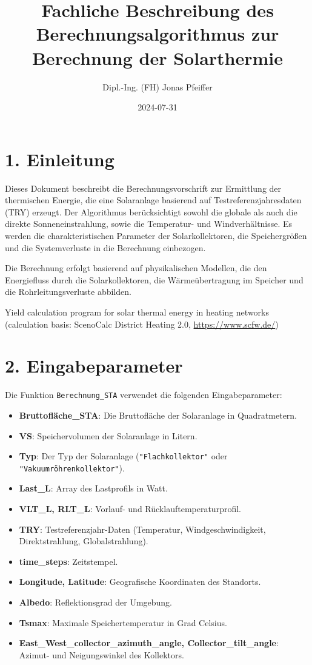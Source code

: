 \documentclass{article}
\title{Fachliche Beschreibung des Berechnungsalgorithmus zur Berechnung der Solarthermie}
\author{Dipl.-Ing. (FH) Jonas Pfeiffer}
\date{2024-07-31}
\begin{document}
\maketitle

\section*{1. Einleitung}

Dieses Dokument beschreibt die Berechnungsvorschrift zur Ermittlung der thermischen Energie, die eine Solaranlage basierend auf Testreferenzjahresdaten (TRY) erzeugt. Der Algorithmus berücksichtigt sowohl die globale als auch die direkte Sonneneinstrahlung, sowie die Temperatur- und Windverhältnisse. Es werden die charakteristischen Parameter der Solarkollektoren, die Speichergrößen und die Systemverluste in die Berechnung einbezogen. 

Die Berechnung erfolgt basierend auf physikalischen Modellen, die den Energiefluss durch die Solarkollektoren, die Wärmeübertragung im Speicher und die Rohrleitungsverluste abbilden.

Yield calculation program for solar thermal energy in heating networks (calculation basis: ScenoCalc District Heating 2.0, \url{https://www.scfw.de/})

\section*{2. Eingabeparameter}

Die Funktion \texttt{Berechnung\_STA} verwendet die folgenden Eingabeparameter:

\begin{itemize}
    \item \textbf{Bruttofläche\_STA}: Die Bruttofläche der Solaranlage in Quadratmetern.
    \item \textbf{VS}: Speichervolumen der Solaranlage in Litern.
    \item \textbf{Typ}: Der Typ der Solaranlage (\texttt{"Flachkollektor"} oder \texttt{"Vakuumröhrenkollektor"}).
    \item \textbf{Last\_L}: Array des Lastprofils in Watt.
    \item \textbf{VLT\_L, RLT\_L}: Vorlauf- und Rücklauftemperaturprofil.
    \item \textbf{TRY}: Testreferenzjahr-Daten (Temperatur, Windgeschwindigkeit, Direktstrahlung, Globalstrahlung).
    \item \textbf{time\_steps}: Zeitstempel.
    \item \textbf{Longitude, Latitude}: Geografische Koordinaten des Standorts.
    \item \textbf{Albedo}: Reflektionsgrad der Umgebung.
    \item \textbf{Tsmax}: Maximale Speichertemperatur in Grad Celsius.
    \item \textbf{East\_West\_collector\_azimuth\_angle, Collector\_tilt\_angle}: Azimut- und Neigungswinkel des Kollektors.
\end{itemize}
\end{document}
